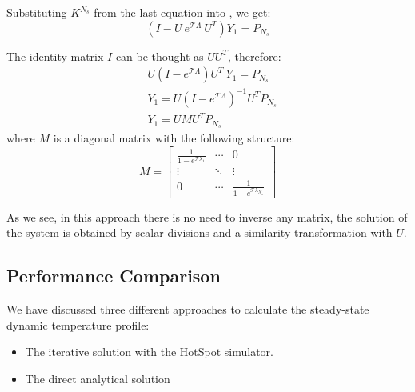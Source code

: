 Substituting $K^{N_s}$ from the last equation into , we get:
\[
  (I - U \: e^{\mathcal{T} \Lambda} \: U^T) Y_1 = P_{N_s}
\]

The identity matrix $I$ can be thought as $U U^T$, therefore:
\begin{align*}
  & U (I - e^{\mathcal{T} \Lambda}) U^T \: Y_1 = P_{N_s} \\
  & Y_1 = U (I - e^{\mathcal{T} \Lambda})^{-1} U^T P_{N_s} \\
  & Y_1 = U M U^T P_{N_s}
\end{align*}
where $M$ is a diagonal matrix with the following structure:
\[
  M = \left[
    \begin{array}{ccc}
      \frac{1}{1 - e^{\mathcal{T} \lambda_1}} & \cdots & 0 \\
      \vdots & \ddots & \vdots \\
      0 & \cdots & \frac{1}{1 - e^{\mathcal{T} \lambda_{N_n}}}
    \end{array}
  \right]
\]

As we see, in this approach there is no need to inverse any matrix, the solution of the system is obtained by scalar divisions and a similarity transformation with $U$.

\subsection{Performance Comparison}
We have discussed three different approaches to calculate the steady-state dynamic temperature profile:
\begin{itemize}
  \item The iterative solution with the HotSpot simulator.
  \item The direct analytical solution
\end{itemize}
